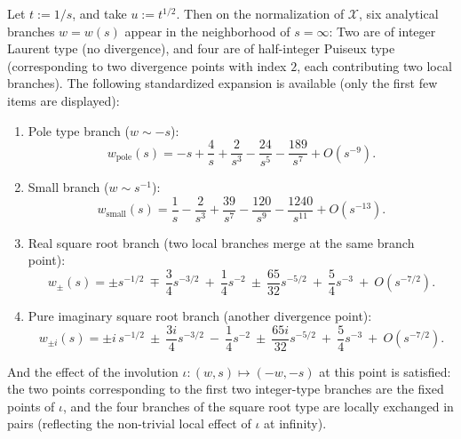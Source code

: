 \begin{remark}[\texorpdfstring{$s=\infty$}{s=infty} Puiseux branch classification and explicit expansion]\label{rem:sync-hatdelta-puiseux-at-infty}
Let \(t:=1/s\), and take \(u:=t^{1/2}\).
Then on the normalization of \(\mathcal{X}\), six analytical branches \(w=w(s)\) appear in the neighborhood of \(s=\infty\):
Two are of integer Laurent type (no divergence), and four are of half-integer Puiseux type (corresponding to two divergence points with index \(2\), each contributing two local branches).
The following standardized expansion is available (only the first few items are displayed):
\begin{enumerate}
\item Pole type branch (\(w\sim -s\)):
  \[
  w_{\mathrm{pole}}(s)= -s+\frac{4}{s}+\frac{2}{s^3}-\frac{24}{s^5}-\frac{189}{s^7}+O(s^{-9}).
  \]
\item Small branch (\(w\sim s^{-1}\)):
  \[
  w_{\mathrm{small}}(s)= \frac{1}{s}-\frac{2}{s^3}+\frac{39}{s^7}-\frac{120}{s^9}-\frac{1240}{s^{11}}+O(s^{-13}).
  \]
\item Real square root branch (two local branches merge at the same branch point):
  \[
  w_{\pm}(s)=\pm s^{-1/2}\ \mp\ \frac{3}{4}s^{-3/2}\ +\ \frac{1}{4}s^{-2}\ \pm\ \frac{65}{32}s^{-5/2}\ +\ \frac{5}{4}s^{-3}\ +\ O(s^{-7/2}).
  \]
\item Pure imaginary square root branch (another divergence point):
  \[
  w_{\pm i}(s)=\pm i\,s^{-1/2}\ \pm\ \frac{3i}{4}s^{-3/2}\ -\ \frac{1}{4}s^{-2}\ \pm\ \frac{65i}{32}s^{-5/2}\ +\ \frac{5}{4}s^{-3}\ +\ O(s^{-7/2}).
  \]
\end{enumerate}
And the effect of the involution \(\iota:(w,s)\mapsto(-w,-s)\) at this point is satisfied: the two points corresponding to the first two integer-type branches are the fixed points of \(\iota\), and the four branches of the square root type are locally exchanged in pairs (reflecting the non-trivial local effect of \(\iota\) at infinity).
\end{remark}

